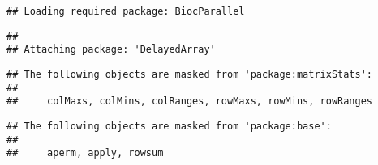 \documentclass[]{article}
\begin{document}
\begin{verbatim}
## Loading required package: BiocParallel
\end{verbatim}

\begin{verbatim}
## 
## Attaching package: 'DelayedArray'
\end{verbatim}

\begin{verbatim}
## The following objects are masked from 'package:matrixStats':
## 
##     colMaxs, colMins, colRanges, rowMaxs, rowMins, rowRanges
\end{verbatim}

\begin{verbatim}
## The following objects are masked from 'package:base':
## 
##     aperm, apply, rowsum
\end{verbatim}
\end{document}

